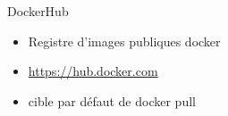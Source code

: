 \begin{frame}{DockerHub}
    \begin{itemize}
        \item Registre d'images publiques docker
        \item \href{https://hub.docker.com}{https://hub.docker.com}
        \item cible par défaut de docker pull
    \end{itemize}
\end{frame}
